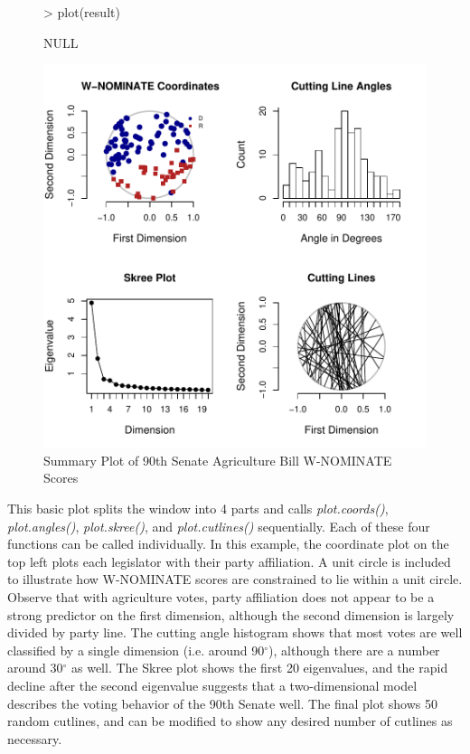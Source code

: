 \documentclass[12pt]{article}
\begin{document}
\begin{figure}
\begin{center}
\begin{Schunk}
\begin{Sinput}
> plot(result)
\end{Sinput}
\begin{Soutput}
NULL
\end{Soutput}
\end{Schunk}
\includegraphics{wnominate-four}
\end{center}
\caption{Summary Plot of 90th Senate Agriculture Bill W-NOMINATE Scores}
\label{fig:one}
\end{figure}

This basic plot splits the window into 4 parts and calls
\emph{plot.coords()}, \emph{plot.angles()}, \emph{plot.skree()},
and \emph{plot.cutlines()} sequentially.  Each of these four
functions can be called individually.  In this example, the
coordinate plot on the top left plots each legislator with their
party affiliation. A unit circle is included to illustrate how
W-NOMINATE scores are constrained to lie within a unit circle.
Observe that with agriculture votes, party affiliation does not
appear to be a strong predictor on the first dimension, although
the second dimension is largely divided by party line.
The cutting angle histogram shows that most votes are well classified
by a single dimension (i.e. around 90$^\circ$), although there are a
number around 30$^\circ$ as well.  The Skree plot shows the first 20
eigenvalues, and the rapid decline after the second eigenvalue suggests
that a two-dimensional model describes the voting behavior of the 90th
Senate well.  The final plot shows 50 random cutlines, and can be
modified to show any desired number of cutlines as necessary.
\end{document}
